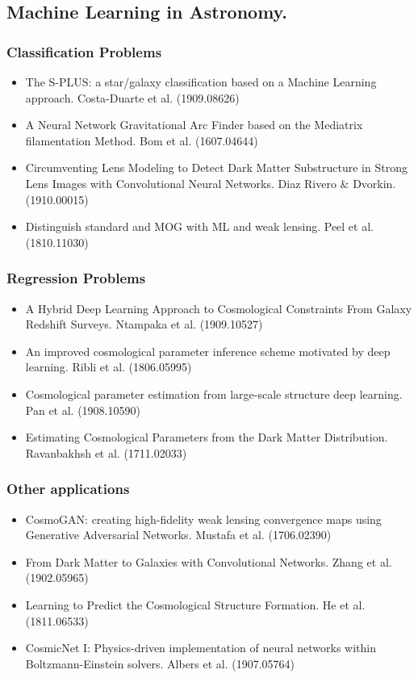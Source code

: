 \documentclass{beamer}
\begin{document}
\subsection{Machine Learning in Astronomy.}
\frame{
\tableofcontents[ 
    currentsubsection, 
    sectionstyle=show/hide, 
    sectionstyle=show/shaded, 
    ] 
}

\begin{frame}
\frametitle{Classification Problems}
\begin{itemize}
 \item The S-PLUS: a star/galaxy classification based on a Machine Learning approach. {\color{azul}Costa-Duarte et al. (1909.08626)}
 \item A Neural Network Gravitational Arc Finder based on the Mediatrix filamentation Method. {\color{azul} Bom et al.  (1607.04644)}
 \item Circumventing Lens Modeling to Detect Dark Matter Substructure in Strong Lens
Images with Convolutional Neural Networks. {\color{azul}Diaz Rivero \& Dvorkin.  (1910.00015)}
 \item Distinguish standard and MOG with ML and weak
lensing. {\color{azul}Peel et al.  (1810.11030)}
\end{itemize}
\end{frame}

\begin{frame}
 \frametitle{Regression Problems}
 \begin{itemize}
  \item A Hybrid Deep Learning Approach to Cosmological Constraints From Galaxy Redshift Surveys.{\color{azul} Ntampaka et al.  (1909.10527)}
  \item An improved cosmological parameter inference scheme motivated by deep learning. {\color{azul} Ribli et al. (1806.05995)}
  \item Cosmological parameter estimation from large-scale structure deep learning. {\color{azul} Pan et al. (1908.10590)}
  \item Estimating Cosmological Parameters from the Dark Matter Distribution. {\color{azul} Ravanbakhsh et al. (1711.02033)}
 \end{itemize}

\end{frame}

\begin{frame}
 \frametitle{Other applications}
 \begin{itemize}
  \item CosmoGAN: creating high-fidelity weak lensing convergence maps using Generative Adversarial Networks. {\color{azul} Mustafa et al.  (1706.02390)}
  \item From Dark Matter to Galaxies with Convolutional Networks. {\color{azul} Zhang et al.  (1902.05965)}
  \item Learning to Predict the Cosmological Structure Formation.{\color{azul} He et al. (1811.06533)}
  \item CosmicNet I: Physics-driven implementation of neural networks within Boltzmann-Einstein solvers. {\color{azul} Albers et al.  (1907.05764)}
 \end{itemize}

\end{frame}
\end{document}
